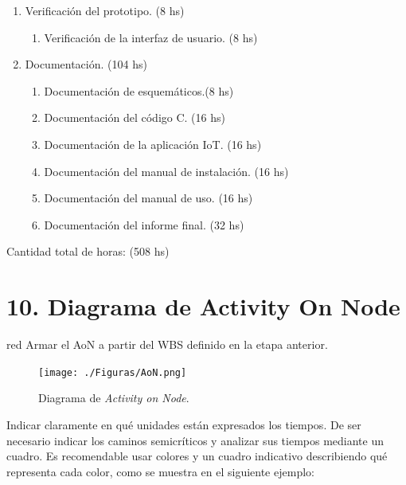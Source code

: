 \documentclass[
11pt, %
]{charter}
\begin{document}
\begin{enumerate}
\item Verificación del prototipo. (8 hs)
	\begin{enumerate}
	\item Verificación de la interfaz de usuario. (8 hs)
	\end{enumerate}	
	
\item Documentación. (104 hs)
	\begin{enumerate}
	\item Documentación de esquemáticos.(8 hs)
	\item Documentación del código C. (16 hs)
	\item Documentación de la aplicación IoT. (16 hs)
	\item Documentación del manual de instalación. (16 hs)
	\item Documentación del manual de uso. (16 hs)
	\item Documentación del informe final. (32 hs)

	\end{enumerate}


\end{enumerate}

Cantidad total de horas: (508 hs)



\section{10. Diagrama de Activity On Node}
\label{sec:AoN}

\begin{consigna}{red}
Armar el AoN a partir del WBS definido en la etapa anterior. 



\end{consigna}

\begin{figure}[htpb]
\centering 
\texttt{[image: ./Figuras/AoN.png]}
\caption{Diagrama de \textit{Activity on Node}.}
\label{fig:AoN}
\end{figure}

Indicar claramente en qué unidades están expresados los tiempos.
De ser necesario indicar los caminos semicríticos y analizar sus tiempos mediante un cuadro.
Es recomendable usar colores y un cuadro indicativo describiendo qué representa cada color, como se muestra en el siguiente ejemplo:
\end{document}
